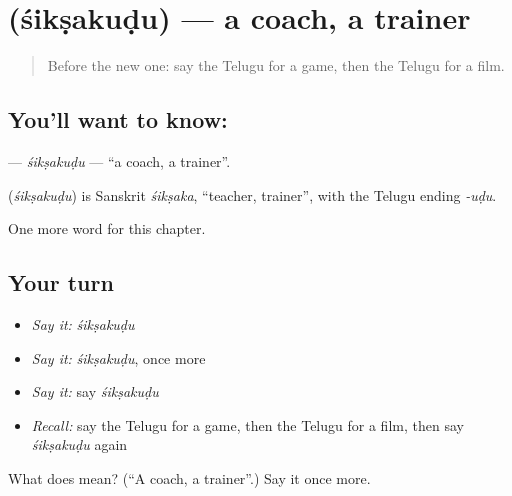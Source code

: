 \section[\texorpdfstring{\te{శిక్షకుడు} (śikṣakuḍu)}{శిక్షకుడు (śikṣakuḍu)}]{ (śikṣakuḍu) — a coach, a trainer}

\label{lesson:TE-C312-siksakudu}



\begin{quote}
Before the new one: say the Telugu for a game, then the Telugu for a film.
\end{quote}

\subsection*{You'll want to know: }
\textbf{} — \emph{śikṣakuḍu} — \textquotedblleft{}a coach, a trainer\textquotedblright{}.

\begin{cousinweb}
\textbf{} (\emph{śikṣakuḍu}) is Sanskrit \emph{śikṣaka}, \textquotedblleft{}teacher, trainer\textquotedblright{}, with the Telugu ending \emph{-uḍu}.
\end{cousinweb}

\begin{grammarlens}[title={What you've built}]
One more word for this chapter.
\end{grammarlens}

\subsection*{Your turn}
\begin{itemize}
\raggedright
  \item \emph{Say it:} \emph{śikṣakuḍu}
  \item \emph{Say it:} \emph{śikṣakuḍu}, once more
  \item \emph{Say it:} say \emph{śikṣakuḍu}
  \item \emph{Recall:} say the Telugu for a game, then the Telugu for a film, then say \emph{śikṣakuḍu} again
\end{itemize}

\begin{tcolorbox}[breakable,colback=teal!4,colframe=teal!35!black,title={Before you move on}]
What does  mean? (\textquotedblleft{}A coach, a trainer\textquotedblright{}.) Say it once more.
\end{tcolorbox}
